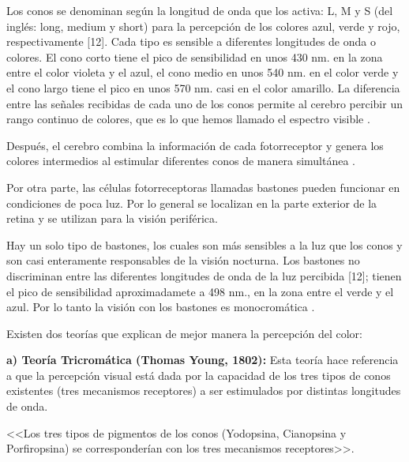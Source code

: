 \documentclass[10pt]{article}
\begin{document}
Los conos se denominan según la longitud de onda que los activa: L, M y S (del inglés: long, medium y short) para la percepción de los colores azul, verde y rojo, respectivamente [12]. Cada tipo es sensible a diferentes longitudes de onda o colores. El cono corto tiene el pico de sensibilidad en unos 430 nm. en la zona entre el color violeta y el azul, el cono medio en unos 540 nm. en el color verde y el cono largo tiene el pico en unos 570 nm. casi en el color amarillo. La diferencia entre las señales recibidas de cada uno de los conos permite al cerebro percibir un rango continuo de colores, que es lo que hemos llamado el espectro visible \cite{IEEEreferencias:Ref13}.

\newpage
Después, el cerebro combina la información de cada fotorreceptor y genera los colores intermedios al estimular diferentes conos de manera simultánea \cite{IEEEreferencias:Ref12}.

\setlength{\parskip}{2mm}

Por otra parte, las células fotorreceptoras llamadas bastones pueden funcionar en condiciones de poca luz. Por lo general se localizan en la parte exterior de la retina y se utilizan para la visión periférica\cite{IEEEreferencias:Ref13}.

\setlength{\parskip}{2mm}

Hay un solo tipo de bastones, los cuales son más sensibles a la luz que los conos y son casi enteramente responsables de la visión nocturna. Los bastones no discriminan entre las diferentes longitudes de onda de la luz percibida [12]; tienen el pico de sensibilidad aproximadamete a 498 nm., en la zona entre el verde y el azul. Por lo tanto la visión con los bastones es monocromática \cite{IEEEreferencias:Ref13}.

\setlength{\parskip}{2mm}

Existen dos teorías que explican de mejor manera la percepción del color:

\textbf{a)	Teoría Tricromática (Thomas Young, 1802):}
 Esta teoría hace referencia a que la  percepción visual está dada por la capacidad de los tres tipos de conos existentes (tres mecanismos receptores) a ser estimulados por distintas longitudes de onda\cite{IEEEreferencias:Ref14}.
 
\setlength{\parskip}{2mm} 
 
<<Los tres tipos de pigmentos de los conos (Yodopsina, Cianopsina y Porfiropsina) se corresponderían con los tres mecanismos receptores>>\cite{IEEEreferencias:Ref14}.
\end{document}
